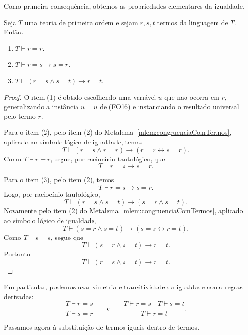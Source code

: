 Como primeira consequência, obtemos as propriedades elementares da igualdade.

\begin{metaproposition}\label{mprop:propriedadesElementaresIgualdade}
    Seja $T$ uma teoria de primeira ordem e sejam $r,s,t$ termos da linguagem de $T$.
    Então:

    \begin{enumerate}
        \item $T\vdash r=r$.

        \item $T\vdash r=s\rightarrow s=r$.

        \item $T\vdash (r=s\wedge s=t)\rightarrow r=t$.
    \end{enumerate}
\end{metaproposition}

\begin{proof}
    O item (1) é obtido escolhendo uma variável $u$ que não ocorra em $r$, generalizando a instância $u=u$ de (FO16) e instanciando o resultado universal pelo termo $r$.

    Para o item (2), pelo item (2) do Metalema~\ref{mlem:congruenciaComTermos}, aplicado ao símbolo lógico de igualdade, temos
    \[
        T\vdash
        (r=s\wedge r=r)\rightarrow(r=r\leftrightarrow s=r).
    \]
    Como $T\vdash r=r$, segue, por raciocínio tautológico, que
    \[
        T\vdash r=s\rightarrow s=r.
    \]

    Para o item (3), pelo item (2), temos
    \[
        T\vdash r=s\rightarrow s=r.
    \]
    Logo, por raciocínio tautológico,
    \[
        T\vdash (r=s\wedge s=t)\rightarrow(s=r\wedge s=t).
    \]
    Novamente pelo item (2) do Metalema~\ref{mlem:congruenciaComTermos}, aplicado ao símbolo lógico de igualdade,
    \[
        T\vdash
        (s=r\wedge s=t)\rightarrow(s=s\leftrightarrow r=t).
    \]
    Como $T\vdash s=s$, segue que
    \[
        T\vdash (s=r\wedge s=t)\rightarrow r=t.
    \]
    Portanto,
    \[
        T\vdash (r=s\wedge s=t)\rightarrow r=t.
    \]
\end{proof}

Em particular, podemos usar simetria e transitividade da igualdade como regras derivadas:
\[
    \frac{T\vdash r=s}{T\vdash s=r}
    \qquad\text{e}\qquad
    \frac{T\vdash r=s \quad T\vdash s=t}{T\vdash r=t}.
\]

Passamos agora à substituição de termos iguais dentro de termos.

